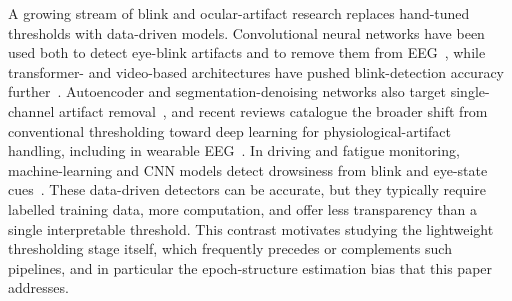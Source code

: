 A growing stream of blink and ocular-artifact research replaces hand-tuned thresholds with data-driven models. Convolutional neural networks have been used both to detect eye-blink artifacts and to remove them from EEG~\citep{jurczak2022implementation,gawande2022deep}, while transformer- and video-based architectures have pushed blink-detection accuracy further~\citep{fodor2023blinklinmult,hong2024robust}. Autoencoder and segmentation-denoising networks also target single-channel artifact removal~\citep{faisal2025eye,li2023segmentation}, and recent reviews catalogue the broader shift from conventional thresholding toward deep learning for physiological-artifact handling, including in wearable EEG~\citep{akshathraj2026physiological,arpaia2025systematic}. In driving and fatigue monitoring, machine-learning and CNN models detect drowsiness from blink and eye-state cues~\citep{cabot2024drowsiness,makhmudov2024real}. These data-driven detectors can be accurate, but they typically require labelled training data, more computation, and offer less transparency than a single interpretable threshold. This contrast motivates studying the lightweight thresholding stage itself, which frequently precedes or complements such pipelines, and in particular the epoch-structure estimation bias that this paper addresses.
